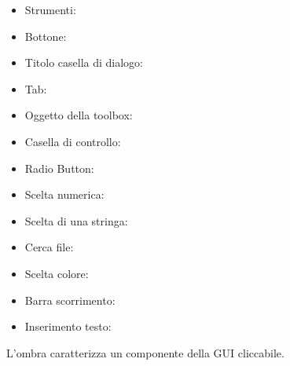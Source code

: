 \begin{itemize}
 > %
 > 
%
\item Strumenti: 
%
\item Bottone: 
%
%
\item Titolo casella di dialogo: 
%
\item Tab: 
%
\item Oggetto della toolbox: 
%
\item Casella di controllo: 
%
\item Radio Button:   
%
\item Scelta numerica: 
%
\item Scelta di una stringa: 
%
%
\item Cerca file: \browsebutton 
%
\item Scelta colore: 
%
\item Barra scorrimento: 
%
\item Inserimento testo: 
\end{itemize}
L'ombra caratterizza un componente della GUI cliccabile.

